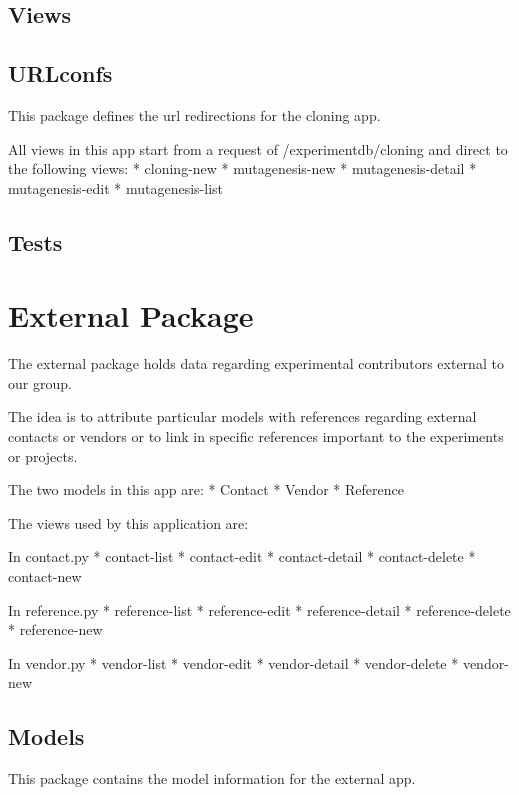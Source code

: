 \documentclass[letterpaper,10pt,english]{sphinxmanual}
\begin{document}
\subsection{Views}
\label{api:id6}\label{api:module-experimentdb.cloning.views}

\subsection{URLconfs}
\label{api:id7}\label{api:module-experimentdb.cloning.urls}
This package defines the url redirections for the cloning app.


All views in this app start from a request of /experimentdb/cloning and direct to the following views:
* cloning-new
* mutagenesis-new
* mutagenesis-detail
* mutagenesis-edit
* mutagenesis-list



\subsection{Tests}
\label{api:id8}

\section{External Package}
\label{api:module-experimentdb.external}\label{api:external-package}
The external package holds data regarding experimental contributors external to our group.


The idea is to attribute particular models with references regarding external contacts or vendors or to link in specific references important to the experiments or projects.


The two models in this app are:
* Contact
* Vendor
* Reference


The views used by this application are:


In contact.py
* contact-list
* contact-edit
* contact-detail
* contact-delete
* contact-new


In reference.py
* reference-list
* reference-edit
* reference-detail
* reference-delete
* reference-new


In vendor.py
* vendor-list
* vendor-edit
* vendor-detail
* vendor-delete
* vendor-new



\subsection{Models}
\label{api:id9}\label{api:module-experimentdb.external.models}
This package contains the model information for the external app.
\end{document}
